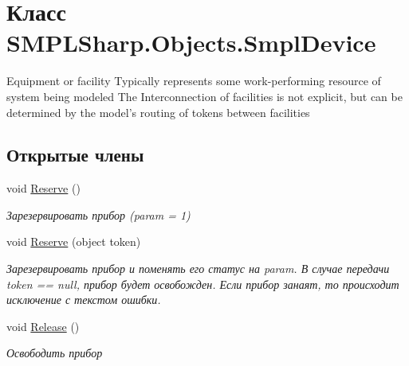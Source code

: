 \hypertarget{class_s_m_p_l_sharp_1_1_objects_1_1_smpl_device}{\section{Класс S\-M\-P\-L\-Sharp.\-Objects.\-Smpl\-Device}
\label{d7/d39/class_s_m_p_l_sharp_1_1_objects_1_1_smpl_device}
}


Equipment or facility Typically represents some work-\/performing resource of system being modeled The Interconnection of facilities is not explicit, but can be determined by the model’s routing of tokens between facilities  


\subsection*{Открытые члены}
\begin{DoxyCompactItemize}
\item 
void \hyperlink{class_s_m_p_l_sharp_1_1_objects_1_1_smpl_device_a43be17c0606bf8f720149c2777a33e31}{Reserve} ()
\begin{DoxyCompactList}\small\item\em Зарезервировать прибор (param = 1) \end{DoxyCompactList}\item 
void \hyperlink{class_s_m_p_l_sharp_1_1_objects_1_1_smpl_device_a8fac05272f1a7e1213336639e3453512}{Reserve} (object token)
\begin{DoxyCompactList}\small\item\em Зарезервировать прибор и поменять его статус на param. В случае передачи token == null, прибор будет освобожден. Если прибор занаят, то происходит исключение с текстом ошибки. \end{DoxyCompactList}\item 
void \hyperlink{class_s_m_p_l_sharp_1_1_objects_1_1_smpl_device_a81feb298bcfe5e7c87cd0e91a1a329ce}{Release} ()
\begin{DoxyCompactList}\small\item\em Освободить прибор \end{DoxyCompactList}\end{DoxyCompactItemize}
